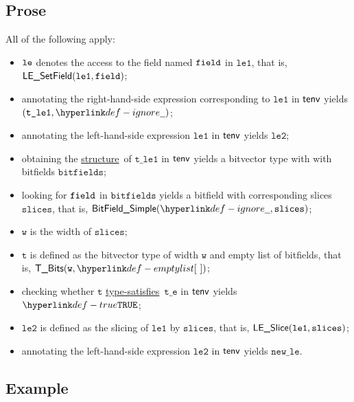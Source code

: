 \documentclass{book}
\newcommand\ProseOrTypeError[0]{\ProseTerminateAs{\TypeErrorConfig}}
\newcommand\structure[0]{\hyperlink{def-structure}{structure}}
\newcommand\typesatisfies[0]{\hyperlink{def-typesatisfies}{type-satisfies}}
\newcommand\vt[0]{\texttt{t}}
\newcommand\vte[0]{\texttt{t\_e}}
\newcommand\vleone[0]{\texttt{le1}}
\newcommand\vletwo[0]{\texttt{le2}}
\newcommand\vtleone[0]{\texttt{t\_le1}}
\newcommand\vw[0]{\texttt{w}}
\newcommand\bitfields[0]{\texttt{bitfields}}
\newcommand\newle[0]{\texttt{new\_le}}
\newcommand\slices[0]{\texttt{slices}}
\begin{document}
\subsection{Prose}
All of the following apply:
\begin{itemize}
\item $\texttt{le}$ denotes the access to the field named $\texttt{field}$ in $\vleone$, that is, \\ $\LESetField(\vleone, \field)$;
\item annotating the right-hand-side expression corresponding to $\vleone$ in $\textsf{tenv}$ yields \\ $(\vtleone, \Ignore)$\ProseOrTypeError;
\item annotating the left-hand-side expression $\vleone$ in $\textsf{tenv}$ yields $\vletwo$\ProseOrTypeError;
\item obtaining the \structure\ of $\vtleone$ in $\textsf{tenv}$ yields a bitvector type with with bitfields $\bitfields$\ProseOrTypeError;
\item looking for $\texttt{field}$ in $\bitfields$ yields a bitfield with corresponding slices $\slices$, that is, $\BitFieldSimple(\Ignore, \slices)$;
\item $\vw$ is the width of $\slices$;
\item $\vt$ is defined as the bitvector type of width $\vw$ and empty list of bitfields, that is, $\TBits(\vw, \emptylist)$;
\item checking whether $\vt$ \typesatisfies\ $\vte$ in $\textsf{tenv}$ yields $\True$\ProseOrTypeError;
\item $\vletwo$ is defined as the slicing of $\vleone$ by $\slices$, that is, $\LESlice(\vleone, \slices)$;
\item annotating the left-hand-side expression $\vletwo$ in $\textsf{tenv}$ yields $\newle$\ProseOrTypeError.
\end{itemize}

\subsection{Example}

\end{document}
